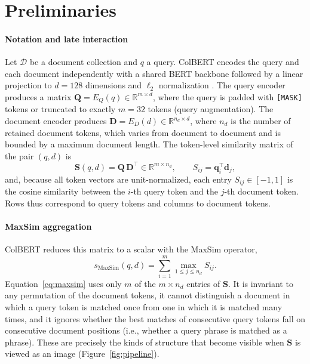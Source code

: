 \documentclass[preprint,5p,times,twocolumn,authoryear]{elsarticle}
\begin{document}
\section{Preliminaries}
\label{sec:prelim}

\paragraph{Notation and late interaction}
Let $\mathcal{D}$ be a document collection and $q$ a query. ColBERT encodes the query and each document independently with a shared BERT backbone followed by a linear projection to $d=128$ dimensions and $\ell_2$ normalization \citep{colbert,v2}. The query encoder produces a matrix $\mathbf{Q}=E_Q(q)\in\mathbb{R}^{m\times d}$, where the query is padded with \texttt{[MASK]} tokens or truncated to exactly $m=32$ tokens (query augmentation). The document encoder produces $\mathbf{D}=E_D(d)\in\mathbb{R}^{n_d\times d}$, where $n_d$ is the number of retained document tokens, which varies from document to document and is bounded by a maximum document length. The token-level similarity matrix of the pair $(q,d)$ is
\begin{equation}
\mathbf{S}(q,d) = \mathbf{Q}\,\mathbf{D}^{\top} \in \mathbb{R}^{m\times n_d}, \qquad S_{ij} = \mathbf{q}_i^{\top}\mathbf{d}_j ,
\label{eq:simmatrix}
\end{equation}
and, because all token vectors are unit-normalized, each entry $S_{ij}\in[-1,1]$ is the cosine similarity between the $i$-th query token and the $j$-th document token. Rows thus correspond to query tokens and columns to document tokens.

\paragraph{MaxSim aggregation}
ColBERT reduces this matrix to a scalar with the MaxSim operator,
\begin{equation}
s_{\mathrm{MaxSim}}(q,d) = \sum_{i=1}^{m} \max_{1\le j\le n_d} S_{ij}.
\label{eq:maxsim}
\end{equation}
Equation~\eqref{eq:maxsim} uses only $m$ of the $m\times n_d$ entries of $\mathbf{S}$. It is invariant to any permutation of the document tokens, it cannot distinguish a document in which a query token is matched once from one in which it is matched many times, and it ignores whether the best matches of consecutive query tokens fall on consecutive document positions (i.e., whether a query phrase is matched as a phrase). These are precisely the kinds of structure that become visible when $\mathbf{S}$ is viewed as an image (Figure~\ref{fig:pipeline}).
\end{document}
